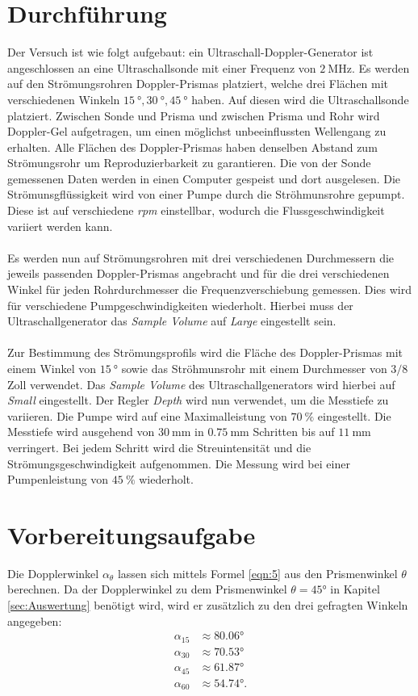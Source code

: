 \section{Durchführung}
\label{sec:Durchführung}

Der Versuch ist wie folgt aufgebaut: ein Ultraschall-Doppler-Generator ist
angeschlossen an eine
Ultraschallsonde mit einer Frequenz von $\SI{2}{\mega\hertz}$. Es werden auf den
Strömungsrohren Doppler-Prismas platziert, welche drei Flächen mit verschiedenen
Winkeln $\SI{15}{\degree}, \SI{30}{\degree}, \SI{45}{\degree}$ haben. Auf diesen
wird die Ultraschallsonde platziert. Zwischen Sonde und Prisma und zwischen Prisma
und Rohr wird Doppler-Gel aufgetragen, um einen möglichst unbeeinflussten
Wellengang zu erhalten. Alle Flächen des Doppler-Prismas haben denselben Abstand zum
Strömungsrohr um Reproduzierbarkeit zu garantieren.
Die von der Sonde gemessenen Daten werden in einen Computer gespeist und dort
ausgelesen. Die Strömunsgflüssigkeit wird von einer Pumpe durch die Ströhmunsrohre
gepumpt. Diese ist auf verschiedene \textit{rpm} einstellbar, wodurch die
Flussgeschwindigkeit variiert werden kann. \\
\\
Es werden nun auf Strömungsrohren mit drei verschiedenen Durchmessern die
jeweils passenden Doppler-Prismas angebracht und für die drei verschiedenen
Winkel für jeden Rohrdurchmesser die Frequenzverschiebung gemessen. Dies wird
für verschiedene Pumpgeschwindigkeiten wiederholt. Hierbei muss der
Ultraschallgenerator das \textit{Sample Volume} auf \textit{Large} eingestellt sein.\\
\\
Zur Bestimmung des Strömungsprofils wird die Fläche des Doppler-Prismas
mit einem Winkel von $\SI{15}{\degree}$ sowie das Ströhmunsrohr mit einem Durchmesser
von $3/8$ Zoll verwendet. Das \textit{Sample Volume} des Ultraschallgenerators
wird hierbei auf \textit{Small} eingestellt. Der Regler \textit{Depth} wird nun
verwendet, um die Messtiefe zu variieren. Die Pumpe wird auf eine Maximalleistung
von $\SI{70}{\percent}$ eingestellt. Die Messtiefe wird ausgehend von $\SI{30}{\milli\meter}$
in $\SI{0.75}{\milli\meter}$ Schritten bis auf $\SI{11}{\milli\meter}$ verringert.
Bei jedem Schritt wird die Streuintensität und die Strömungsgeschwindigkeit aufgenommen.
Die Messung wird bei einer Pumpenleistung von $\SI{45}{\percent}$ wiederholt.

\section{Vorbereitungsaufgabe}
\label{sec:vorbereitung}
Die Dopplerwinkel $\alpha_{\theta}$ lassen sich mittels Formel \eqref{eqn:5} aus
den Prismenwinkel
$\theta$ berechnen. Da der Dopplerwinkel zu dem
Prismenwinkel $\theta=45°$ in Kapitel \ref{sec:Auswertung} benötigt wird, wird er
zusätzlich zu den drei gefragten Winkeln angegeben:
\begin{align*}
\alpha_{15}&\approx 80.06°\\
\alpha_{30}&\approx 70.53°\\
\alpha_{45}&\approx 61.87°\\
\alpha_{60}&\approx 54.74°  .
\end{align*}
